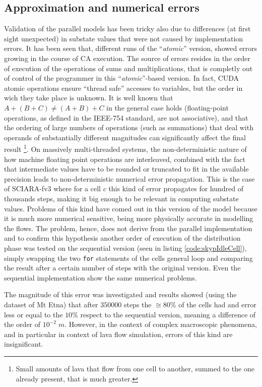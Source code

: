 \subsection{Approximation and numerical errors}
Validation of the parallel models has been tricky also due to differences (at
first sight unexpected) in substate values that were not caused by
implementation errors. 
It has been seen that, different runs of the ``\textit{atomic}'' version,
showed errors growing in the course of CA execution.
The source of errors resides in the order of execution of the operations of
sums and multiplications, that is completly out of control of the programmer in
this ``\textit{atomic}''-based version.
In fact, CUDA atomic operations ensure ``thread safe'' accesses to variables,
but the order in wich they take place is unknown. 
It is well known that \(A+(B+C) \neq (A+B)+C\) in the general case holds
(floating-point operations, as defined in the IEEE-754 standard, are not
associative), and that the ordering of large numbers of operations (such as summations) that deal
with operands of substantially different magnitudes can significantly affect the
final result \cite{Villa_effectsof}\footnote{Small amounts of lava that flow
from one cell to another, summed to the one already present, that is
much greater.}.
On massively multi-threaded systems, the
non-deterministic nature of how machine floating point operations are
interleaved, combined with the fact that intermediate values have to be rounded
or truncated to fit in the available precision leads to non-deterministic
numerical error propagation.
This is the case of SCIARA-fv3 where for a cell \(c\) this kind of error
propagates for hundred of thousands steps, making it big enough to be relevant
in computing substate values.
Problems of this kind have comed out in this version of the model because it is
much more numerical sensitive, being more physically accurate in modelling the
flows.
The problem, hence, does not derive from the parallel implementation and to
confirm this hypothesis another order of execution of the distribution phase was
tested on the sequential version (seen in listing \ref{code:skypIdleCell}), simply
swapping the two \texttt{for} statements of the cells general loop and
comparing the result after a certain number of steps with the original version.
Even the sequential implementation show the same numerical problems.

The magnitude of this error was investigated and results showed (using the
dataset of Mt Etna) that after \(350000\) steps the \(\cong80\%\) of the cells
had and error less or equal to the \(10\%\) respect to the sequential version,
meaning a difference of the order of \(10^{-2}\;m\).
However, in the context of complex macroscopic phenomena, and in particular in
context of lava flow simulation, errors of this kind are insignificant.


